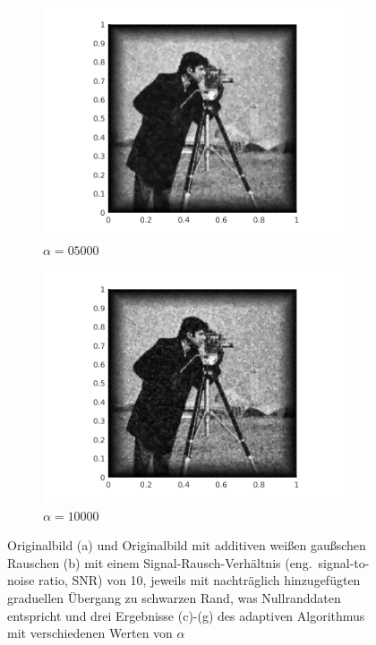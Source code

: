 \begin{figure}[h]
  \begin{subfigure}{.3\linewidth}
    \includegraphics[trim = 60 0 60 20, clip, width=\linewidth]
      {pictures/introBeta/snr10/05000.png}
    \caption{$\alpha=05000$}
    \label{fig:snr10alpha5000}
  \end{subfigure}
  \begin{subfigure}{.3\linewidth}
    \includegraphics[trim = 60 0 60 20, clip, width=\linewidth]
      {pictures/introBeta/snr10/10000.png}
    \caption{$\alpha=10000$}
    \label{fig:snr10alpha10000}
  \end{subfigure}
  \caption{Originalbild (a) und Originalbild mit additiven weißen gaußschen
  Rauschen (b) mit einem Signal-Rausch-Verhältnis (eng.\ signal-to-noise
  ratio, SNR) von 10, jeweils mit nachträglich hinzugefügten graduellen
  Übergang zu schwarzen Rand, was Nullranddaten entspricht und drei Ergebnisse
  (c)-(g) des adaptiven Algorithmus mit verschiedenen Werten von $\alpha$}
  \label{fig:exampleDenoising}
\end{figure}

